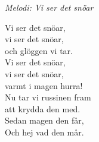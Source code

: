 {\footnotesize\textit{Melodi: Vi ser det snöar}}\par
\vspace{10pt}
Vi ser det snöar,\\
vi ser det snöar,\\
och glöggen vi tar.\\
Vi ser det snöar,\\
vi ser det snöar,\\
varmt i magen hurra!\\
Nu tar vi russinen fram\\
att krydda den med.\\
Sedan magen den får,\\
Och hej vad den mår.
